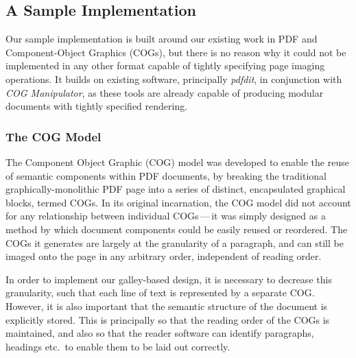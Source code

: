 \documentclass{sig-alternate}
\begin{document}



\subsection{A Sample Implementation}
Our sample implementation is built around our existing work in PDF and Component-Object Graphics (COGs)\cite{Bagley2003}, but there is no reason why it could not be implemented in any other format capable of tightly specifying page imaging operations. It builds on existing software, principally \emph{pdfdit}, in conjunction with \emph{COG Manipulator}, as these tools are already capable of producing modular documents with tightly specified rendering.


\subsubsection{The COG Model}
The Component Object Graphic (COG) model was developed to enable the reuse of semantic components within PDF documents, by breaking the traditional graphically-monolithic PDF page into a series of distinct, encapsulated graphical blocks, termed COGs. In its original incarnation, the COG model did not account for any relationship between individual COGs\,---\,it was simply designed as a method by which document components could be easily reused or reordered. The COGs it generates are largely at the granularity of a paragraph, and can still be imaged onto the page in any arbitrary order, independent of reading order.

In order to implement our galley-based design, it is necessary to decrease this granularity, such that each line of text is represented by a separate COG. However, it is also important that the semantic structure of the document is explicitly stored. This is principally so that the reading order of the COGs is maintained, and also so that the reader software can identify paragraphs, headings etc.~to enable them to be laid out correctly.
\end{document}
